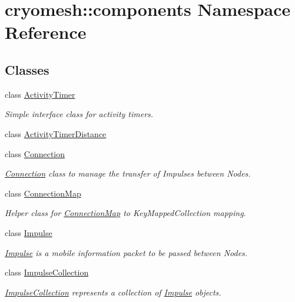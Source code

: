 \hypertarget{namespacecryomesh_1_1components}{\section{cryomesh\-:\-:components \-Namespace \-Reference}
\label{namespacecryomesh_1_1components}
}
\subsection*{\-Classes}
\begin{DoxyCompactItemize}
\item 
class \hyperlink{classcryomesh_1_1components_1_1ActivityTimer}{\-Activity\-Timer}
\begin{DoxyCompactList}\small\item\em \-Simple interface class for activity timers. \end{DoxyCompactList}\item 
class \hyperlink{classcryomesh_1_1components_1_1ActivityTimerDistance}{\-Activity\-Timer\-Distance}
\item 
class \hyperlink{classcryomesh_1_1components_1_1Connection}{\-Connection}
\begin{DoxyCompactList}\small\item\em \hyperlink{classcryomesh_1_1components_1_1Connection}{\-Connection} class to manage the transfer of \-Impulses between \-Nodes. \end{DoxyCompactList}\item 
class \hyperlink{classcryomesh_1_1components_1_1ConnectionMap}{\-Connection\-Map}
\begin{DoxyCompactList}\small\item\em \-Helper class for \hyperlink{classcryomesh_1_1components_1_1ConnectionMap}{\-Connection\-Map} to \-Key\-Mapped\-Collection mapping. \end{DoxyCompactList}\item 
class \hyperlink{classcryomesh_1_1components_1_1Impulse}{\-Impulse}
\begin{DoxyCompactList}\small\item\em \hyperlink{classcryomesh_1_1components_1_1Impulse}{\-Impulse} is a mobile information packet to be passed between \-Nodes. \end{DoxyCompactList}\item 
class \hyperlink{classcryomesh_1_1components_1_1ImpulseCollection}{\-Impulse\-Collection}
\begin{DoxyCompactList}\small\item\em \hyperlink{classcryomesh_1_1components_1_1ImpulseCollection}{\-Impulse\-Collection} represents a collection of \hyperlink{classcryomesh_1_1components_1_1Impulse}{\-Impulse} objects. \end{DoxyCompactList}\item 

\end{DoxyCompactItemize}

